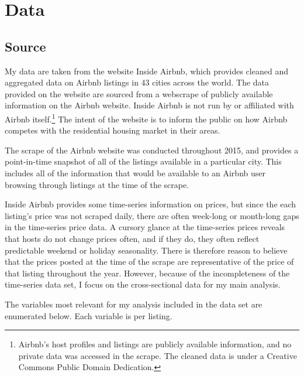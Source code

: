 \documentclass[11pt, oneside]{article}
\begin{document}
\section{Data}
\subsection{Source} %

My data are taken from the website Inside Airbnb, which provides cleaned and aggregated data on Airbnb listings in 43 cities across the world.\cite{insideairbnb} The data provided on the website are sourced from a webscrape of publicly available information on the Airbnb website. Inside Airbnb is not run by or affiliated with Airbnb itself.\footnote{Airbnb's host profiles and listings are publicly available information, and no private data was accessed in the scrape. The cleaned data is under a Creative Commons Public Domain Dedication.} The intent of the website is to inform the public on how Airbnb competes with the residential housing market in their areas. 

The scrape of the Airbnb website was conducted throughout 2015, and provides a point-in-time snapshot of all of the listings available in a particular city. This includes all of the information that would be available to an Airbnb user browsing through listings at the time of the scrape. 

Inside Airbnb provides some time-series information on prices, but since the each listing's price was not scraped daily, there are often week-long or month-long gaps in the time-series price data. A cursory glance at the time-series prices reveals that hosts do not change prices often, and if they do, they often reflect predictable weekend or holiday seasonality. There is therefore reason to believe that the prices posted at the time of the scrape are representative of the price of that listing throughout the year. However, because of the incompleteness of the time-series data set, I focus on the cross-sectional data for my main analysis.  

The variables most relevant for my analysis included in the data set are enumerated below. Each variable is per listing. 
\end{document}
